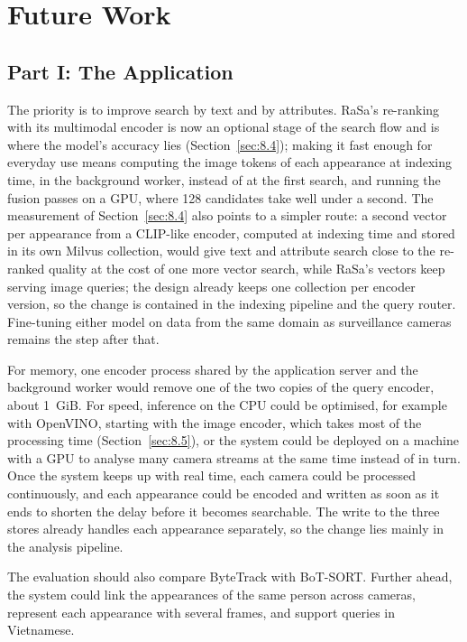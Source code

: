 \section{Future Work}
\label{sec:9.3}

\subsection{Part I: The Application}
\label{sec:12.3.1}

The priority is to improve search by text and by attributes. RaSa's re-ranking with its multimodal encoder is now an optional stage of the search flow and is where the model's accuracy lies (Section~\ref{sec:8.4}); making it fast enough for everyday use means computing the image tokens of each appearance at indexing time, in the background worker, instead of at the first search, and running the fusion passes on a GPU, where 128 candidates take well under a second. The measurement of Section~\ref{sec:8.4} also points to a simpler route: a second vector per appearance from a CLIP-like encoder, computed at indexing time and stored in its own Milvus collection, would give text and attribute search close to the re-ranked quality at the cost of one more vector search, while RaSa's vectors keep serving image queries; the design already keeps one collection per encoder version, so the change is contained in the indexing pipeline and the query router. Fine-tuning either model on data from the same domain as surveillance cameras remains the step after that.

For memory, one encoder process shared by the application server and the background worker would remove one of the two copies of the query encoder, about 1~GiB. For speed, inference on the CPU could be optimised, for example with OpenVINO, starting with the image encoder, which takes most of the processing time (Section~\ref{sec:8.5}), or the system could be deployed on a machine with a GPU to analyse many camera streams at the same time instead of in turn. Once the system keeps up with real time, each camera could be processed continuously, and each appearance could be encoded and written as soon as it ends to shorten the delay before it becomes searchable. The write to the three stores already handles each appearance separately, so the change lies mainly in the analysis pipeline.

The evaluation should also compare ByteTrack with BoT-SORT. Further ahead, the system could link the appearances of the same person across cameras, represent each appearance with several frames, and support queries in Vietnamese.

